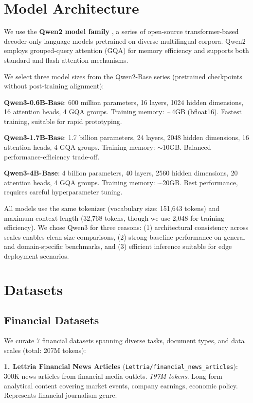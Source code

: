 \section{Model Architecture}

We use the \textbf{Qwen2 model family} \parencite{yang2024qwen2}, a series of open-source transformer-based decoder-only language models pretrained on diverse multilingual corpora. Qwen2 employs grouped-query attention (GQA) for memory efficiency and supports both standard and flash attention mechanisms.

We select three model sizes from the Qwen2-Base series (pretrained checkpoints without post-training alignment):

\textbf{Qwen3-0.6B-Base}: 600 million parameters, 16 layers, 1024 hidden dimensions, 16 attention heads, 4 GQA groups. Training memory: $\sim$4GB (bfloat16). Fastest training, suitable for rapid prototyping.

\textbf{Qwen3-1.7B-Base}: 1.7 billion parameters, 24 layers, 2048 hidden dimensions, 16 attention heads, 4 GQA groups. Training memory: $\sim$10GB. Balanced performance-efficiency trade-off.

\textbf{Qwen3-4B-Base}: 4 billion parameters, 40 layers, 2560 hidden dimensions, 20 attention heads, 4 GQA groups. Training memory: $\sim$20GB. Best performance, requires careful hyperparameter tuning.

All models use the same tokenizer (vocabulary size: 151,643 tokens) and maximum context length (32,768 tokens, though we use 2,048 for training efficiency). We chose Qwen3 for three reasons: (1) architectural consistency across scales enables clean size comparisons, (2) strong baseline performance on general and domain-specific benchmarks, and (3) efficient inference suitable for edge deployment scenarios.

\section{Datasets}

\subsection{Financial Datasets}

We curate 7 financial datasets spanning diverse tasks, document types, and data scales (total: 207M tokens):

\textbf{1. Lettria Financial News Articles} (\texttt{Lettria/financial\_news\_articles}): 300K news articles from financial media outlets. \textit{197M tokens}. Long-form analytical content covering market events, company earnings, economic policy. Represents financial journalism genre.

